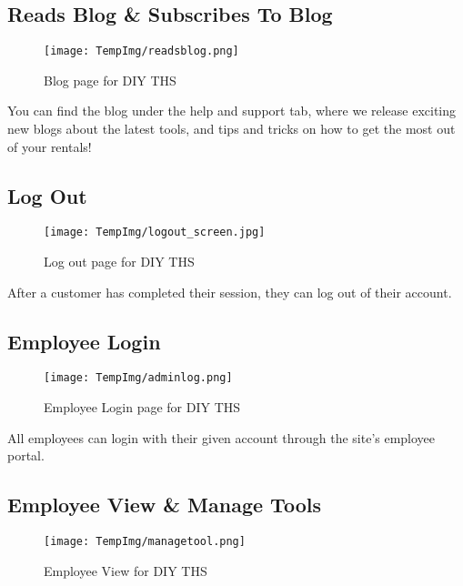 \documentclass[fontsize=11pt]{extarticle}
\numberwithin{figure}{section} %
\numberwithin{table}{section}%
\begin{document}
\hypertarget{reads-blog-subscribes-to-blog}{%
\subsection{Reads Blog \& Subscribes To
Blog}\label{reads-blog-subscribes-to-blog}}

\begin{figure}[H]
      \centering
      \texttt{[image: TempImg/readsblog.png]}
      \caption{Blog page for DIY THS}
 \end{figure}

You can find the blog under the help and support tab, where we release
exciting new blogs about the latest tools, and tips and tricks on how to
get the most out of your rentals!

\hypertarget{log-out}{%
\subsection{Log Out}\label{log-out}}

\begin{figure}[H]
      \centering
      \texttt{[image: TempImg/logout\_screen.jpg]}
      \caption{Log out page for DIY THS}
 \end{figure}

After a customer has completed their session, they can log out of their
account.

\hypertarget{employee-login}{%
\subsection{Employee Login}\label{employee-login}}

\begin{figure}[H]
      \centering
      \texttt{[image: TempImg/adminlog.png]}
      \caption{Employee Login page for DIY THS}
 \end{figure}

All employees can login with their given account through the site's
employee portal.

\hypertarget{employee-view-manage-tools}{%
\subsection{Employee View \& Manage
Tools}\label{employee-view-manage-tools}}

\begin{figure}[H]
      \centering
      \texttt{[image: TempImg/managetool.png]}
      \caption{Employee View for DIY THS}
 \end{figure}
\end{document}

